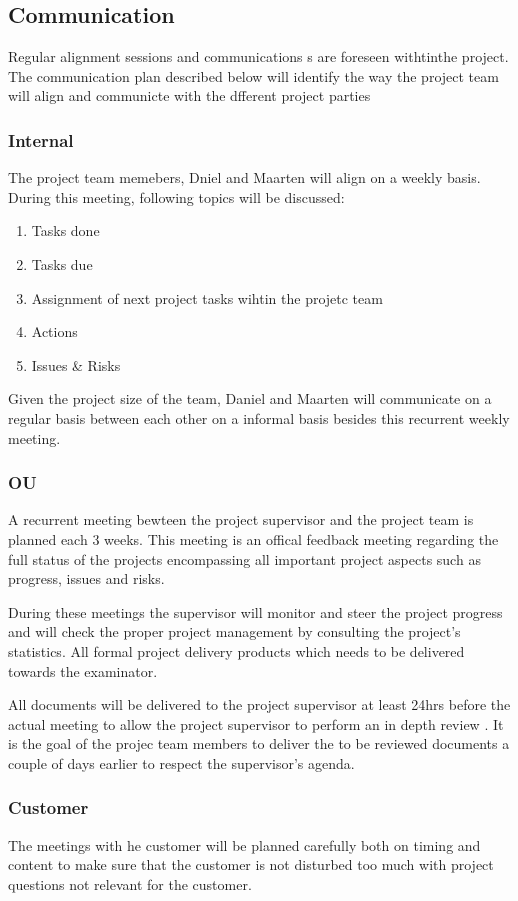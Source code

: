 \subsection{Communication}
Regular alignment sessions and communications s are foreseen withtinthe project. The communication plan described below will identify the way the project team will align and communicte with the dfferent project parties

\subsubsection{Internal}
The project team memebers, Dniel and Maarten will align on a weekly basis.
During this meeting, following topics will be discussed:
\begin{enumerate}
	\item Tasks done
	\item Tasks due
	\item Assignment of next project tasks wihtin the projetc team
	\item Actions
	\item Issues \& Risks
\end {enumerate}
Given the project size of the team, Daniel and Maarten will communicate on a regular basis between each other on a informal basis besides this recurrent weekly meeting.
\subsubsection{OU}
A recurrent meeting bewteen the project supervisor and the project team is planned each 3 weeks.
This meeting is an offical feedback meeting regarding the full status of the projects encompassing all important project aspects such as progress, issues and risks. 

During these meetings the supervisor will monitor and steer the project progress and will check the proper project management by consulting the project's statistics. All formal project delivery products which needs to be delivered towards the examinator. 

All documents will be delivered to the project supervisor at least 24hrs before the actual meeting to allow the project supervisor to perform an in depth review .
It is the goal of the projec team members to deliver the to be reviewed documents a couple of days earlier to respect the supervisor's agenda.

\subsubsection{Customer}
The meetings with he customer will be planned carefully both on timing and content to make sure that the customer is not disturbed too much with project questions not relevant for the customer. 

